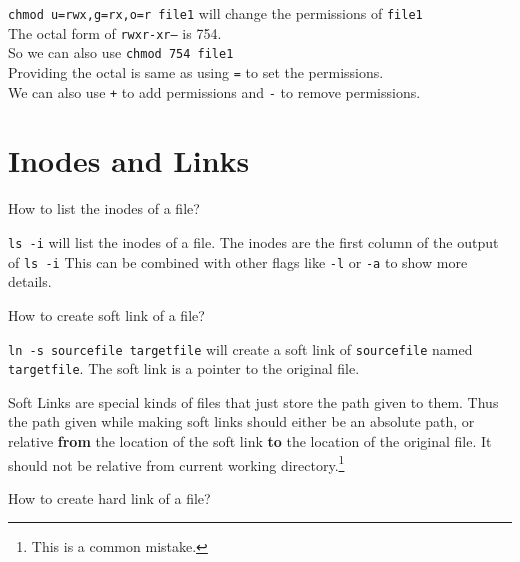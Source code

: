 \begin{ans}
  \texttt{chmod u=rwx,g=rx,o=r file1} will change the permissions of \texttt{file1}\\
  The octal form of \texttt{rwxr-xr--} is 754.\\
  So we can also use \texttt{chmod 754 file1}\\
  Providing the octal is same as using \texttt{=} to set the permissions.\\
  We can also use \texttt{+} to add permissions and \texttt{-} to remove permissions.
\end{ans}

\section{Inodes and Links}

\begin{qs}
  How to list the inodes of a file?
\end{qs}

\begin{ans}
  \texttt{ls -i} will list the inodes of a file.
  The inodes are the first column of the output of \texttt{ls -i}
  This can be combined with other flags like \texttt{-l} or \texttt{-a} to show more details.
\end{ans}

\begin{qs}
  How to create soft link of a file?
\end{qs}

\begin{ans}
  \texttt{ln -s sourcefile targetfile} will create a soft link of \texttt{sourcefile}
  named \texttt{targetfile}.
  The soft link is a pointer to the original file.
\end{ans}

\begin{definition}
  Soft Links are special kinds of files that just store the path
  given to them. Thus the path given while making soft links should
  either be an absolute path, or relative \textbf{from} the location of the
  soft link \textbf{to} the location of the original file. It should not be
  relative from current working directory.\footnote{This is a common mistake.}
\end{definition}

\begin{qs}
  How to create hard link of a file?
\end{qs}

